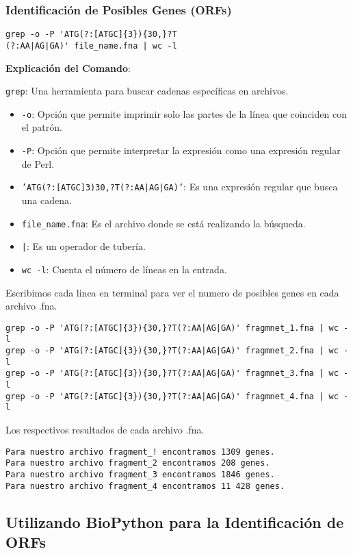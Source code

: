 \subsubsection*{Identificación de Posibles Genes (ORFs)}

\begin{verbatim}
grep -o -P 'ATG(?:[ATGC]{3}){30,}?T
(?:AA|AG|GA)' file_name.fna | wc -l
\end{verbatim}

\textbf{Explicación del Comando}:

\texttt{grep}: Una herramienta para buscar cadenas específicas en archivos.
\begin{itemize}
\item \texttt{-o}: Opción que permite imprimir solo las partes de la línea que coinciden con el patrón.
\item \texttt{-P}: Opción que permite interpretar la expresión como una expresión regular de Perl.
\item \texttt{'ATG(?:[ATGC]{3}){30,}?T(?:AA|AG|GA)'}: Es una expresión regular que busca una cadena.
\item \texttt{file\_name.fna}: Es el archivo donde se está realizando la búsqueda.
\item \texttt{|}: Es un operador de tubería.
\item \texttt{wc -l}: Cuenta el número de líneas en la entrada.
\end{itemize}
Escribimos cada linea en terminal para ver el numero de posibles genes en cada archivo .fna.
\begin{verbatim}
grep -o -P 'ATG(?:[ATGC]{3}){30,}?T(?:AA|AG|GA)' fragmnet_1.fna | wc -l
grep -o -P 'ATG(?:[ATGC]{3}){30,}?T(?:AA|AG|GA)' fragmnet_2.fna | wc -l
grep -o -P 'ATG(?:[ATGC]{3}){30,}?T(?:AA|AG|GA)' fragmnet_3.fna | wc -l
grep -o -P 'ATG(?:[ATGC]{3}){30,}?T(?:AA|AG|GA)' fragmnet_4.fna | wc -l
\end{verbatim}
Los respectivos resultados de cada archivo .fna.
\begin{verbatim}
Para nuestro archivo fragment_! encontramos 1309 genes.
Para nuestro archivo fragment_2 encontramos 208 genes.
Para nuestro archivo fragment_3 encontramos 1846 genes.
Para nuestro archivo fragment_4 encontramos 11 428 genes.
\end{verbatim}

\subsection*{Utilizando BioPython para la Identificación de ORFs}

